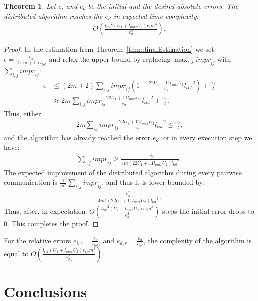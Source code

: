 \documentclass[11pt]{article}
\newcommand{\ltot}{{{l_{\mathit{tot}}}}}
\newcommand{\impr}{{{\mathit{impr}}}}
\newcommand{\lmax}{{{l_{\mathit{max}}}}}
\newtheorem{theorem}{Theorem}
\begin{document}
\begin{theorem}\label{thm::convergence}
Let $e_i$ and $e_d$ be the initial and the desired absolute errors. The distributed algorithm reaches the $e_d$ in expected time complexity:
\begin{align*}
O\left(\frac{\ltot^2 (U_1 +\lmax U_2)e_i m^3}{e_d^2}\right) \textrm{.}
\end{align*}
\end{theorem}
\begin{proof}
In the estimation from Theorem~\ref{thm::finalEstimation} we set $\epsilon = \frac{e_d}{2(m+1)\ltot}$ and relax the upper bound by replacing $\max_{i,j} \mathit{impr}_{ij}$ with $\sum_{i, j} \mathit{impr}_{ij}$:
\begin{align*}
e &\leq (2m+2)\sum_{i, j} \impr_{ij}\left(1 + \frac{22U_1 + 11\lmax U_2}{e_d} \ltot^2\right) + \frac{e_d}{2} \\
  &\approx 2m\sum_{i, j} \impr_{ij}\frac{22U_1 + 11\lmax U_2}{e_d} \ltot^2 + \frac{e_d}{2} \textrm{.}
\end{align*}
Thus, either
\begin{align*}
2m\sum_{ij} \impr_{ij}\frac{22U_1 + 11\lmax U_2}{e_d} \ltot^2 \leq \frac{e_d}{2} \textrm{,}
\end{align*}
and the algorithm has already reached the error $e_d$; or in every execution step we have:
\begin{align*}
\sum_{i, j} \mathit{impr}_{ij} \geq \frac{e_d^2}{4m (22U_1 + 11\lmax U_2) \ltot^2} \text{.}
\end{align*}
The expected improvement of the distributed algorithm during every pairwise communication is $\frac{1}{m^2}\sum_{i, j} \mathit{impr}_{ij}$, and thus it is lower bounded by:
\begin{align*}
\frac{e_d^2}{4m^3 (22U_1 + 11\lmax U_2) \ltot^2} \textrm{.}
\end{align*}
Thus, after, in expectation, $O(\frac{\ltot^2 (U_1 +\lmax U_2)e_i m^3}{e_d^2})$ steps the initial error drops to 0.
This completes the proof.
\end{proof}

For the relative errors $e_{i,r} = \frac{e_i}{\ltot}$, and $e_{d,r} = \frac{e_d}{\ltot}$, the complexity of the algorithm is equal to $O(\frac{\ltot (U_1 +\lmax U_2)e_{i, r} m^3}{e_{d, r}^2})$.

\section{Conclusions}
\end{document}
